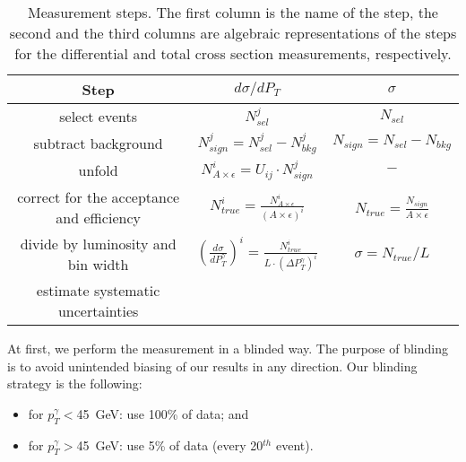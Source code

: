 \begin{table}[h]
  \small
  \begin{center}
  \caption{Measurement steps. The first column is the name of the step, the second and the third columns are algebraic representations of the steps for the differential and total cross section measurements, respectively. }
  \begin{tabular}{|c|c|c|}
    \hline
    Step & $d\sigma/dP_{T}$ & $\sigma$ \\ \hline
    select events & $N_{sel}^j$ &    $N_{sel}$       \\ \hline
    subtract background & $N_{sign}^j = N_{sel}^j - N_{bkg}^j$ &    $N_{sign}=N_{sel}-N_{bkg}$       \\ \hline
    unfold   & $N_{A\times\epsilon}^i = U_{ij} \cdot N_{sign}^j$ &    $-$       \\ \hline
    correct for the acceptance and efficiency & $N_{true}^i = \frac{N_{A\times\epsilon}^i}{(A \times\epsilon)^i}$ &  $N_{true}=\frac{N_{sign}}{A\times\epsilon}$       \\ \hline
    divide by luminosity and bin width & $ \left( \frac{d\sigma}{dP_{T}^\gamma} \right) ^i = \frac{N_{true}^i}{L \cdot (\Delta P_T^\gamma)^i}$  &  $\sigma = N_{true}/L$       \\ \hline
    estimate systematic uncertainties &  &         \\ \hline
  \end{tabular}
  \label{tab:analysisOutline}
  \end{center}
\end{table}

At first, we perform the measurement in a blinded way. The purpose of blinding is to avoid unintended biasing of our results in any direction. Our blinding strategy is the following:
\begin{itemize}
  \item for $p_T^{\gamma}<$45~GeV: use 100\% of data; and
  \item for $p_T^{\gamma}>$45~GeV: use 5\% of data (every 20$^{th}$ event).
\end{itemize}


